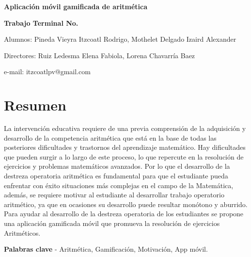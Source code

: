 \documentclass{article}
\begin{document}
\begin{center}
	\begin{Large}
		\textbf{Aplicación móvil gamificada de aritmética}
	\end{Large}

	\textbf{Trabajo Terminal No.}

	Alumnos: Pineda Vieyra Itzcoatl Rodrigo, Mothelet Delgado Izaird Alexander

	Directores: Ruiz Ledesma Elena Fabiola, Lorena Chavarría Baez

	e-mail: itzcoatlpv@gmail.com
\end{center}

\section*{Resumen}
La intervención educativa requiere de una previa comprensión de la adquisición
y desarrollo de la competencia aritmética que está en la base de todas las 
posteriores dificultades y trastornos del aprendizaje matemático. Hay dificultades 
que pueden surgir a lo largo de este proceso, lo que repercute en la resolución de 
ejercicios y problemas matemáticos avanzados. Por lo que el desarrollo de la destreza 
operatoria aritmética es fundamental para que el estudiante pueda enfrentar con éxito  
situaciones más complejas en el campo de la Matemática, además, se requiere motivar al 
estudiante al desarrollar trabajo operatorio aritmético, ya que en ocasiones su desarrollo 
puede resultar monótono y aburrido. Para ayudar al desarrollo de la destreza operatoria 
de los estudiantes se propone una aplicación gamificada móvil que promueva la resolución 
de ejercicios Aritméticos.

\textbf{Palabras clave} - Aritmética, Gamificación, Motivación, App móvil.
\end{document}
